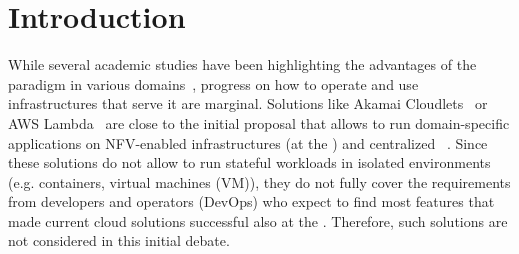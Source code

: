 \vspace*{-.2cm}
\section{Introduction}
\label{sec:intro}

\vspace*{-.1cm}


While several academic studies have been highlighting the advantages
of the \edgecomputing paradigm in various
domains~\cite{bonomi2012fog,satyanarayanan2017emergence,shi2016edge,yi2015fog,zhang2015cloud},
progress on how to operate and use infrastructures that serve it are marginal.
Solutions like Akamai Cloudlets~\cite{akamai:cloudlets} or
AWS Lambda~\cite{amazon:lambda-edge} are close to the initial \fog proposal that
allows to run domain-specific applications on NFV-enabled infrastructures (at
the \edge) and centralized \clouds~\cite{bonomi2012fog}.
%
Since these solutions do not allow to run stateful workloads in isolated
environments (e.g. containers, virtual machines (VM)), they do not fully cover the
requirements from developers and operators (DevOps) who expect
to find most features that made current cloud solutions successful
also at the \edge. 
Therefore, such solutions are not considered in this initial debate.


